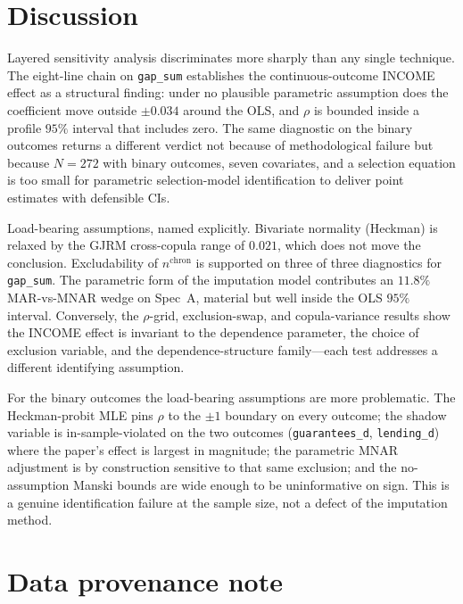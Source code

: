 \documentclass[11pt]{article}
\begin{document}
\section{Discussion}

Layered sensitivity analysis discriminates more sharply than any
single technique. The eight-line chain on \texttt{gap\_sum} establishes
the continuous-outcome INCOME effect as a structural finding: under
no plausible parametric assumption does the coefficient move outside
$\pm 0.034$ around the OLS, and $\rho$ is bounded inside a profile
$95\%$ interval that includes zero. The same diagnostic on the binary
outcomes returns a different verdict not because of methodological
failure but because $N = 272$ with binary outcomes, seven covariates,
and a selection equation is too small for parametric selection-model
identification to deliver point estimates with defensible CIs.

Load-bearing assumptions, named explicitly. Bivariate normality
(Heckman) is relaxed by the GJRM cross-copula range of $0.021$, which
does not move the conclusion. Excludability of $n^{\text{chron}}$ is
supported on three of three diagnostics for \texttt{gap\_sum}. The
parametric form of the imputation model contributes an $11.8\%$
MAR-vs-MNAR wedge on Spec~A, material but well inside the OLS $95\%$
interval. Conversely, the $\rho$-grid, exclusion-swap, and
copula-variance results show the INCOME effect is invariant to the
dependence parameter, the choice of exclusion variable, and the
dependence-structure family---each test addresses a different
identifying assumption.

For the binary outcomes the load-bearing assumptions are more
problematic. The Heckman-probit MLE pins $\rho$ to the $\pm 1$
boundary on every outcome; the shadow variable is in-sample-violated
on the two outcomes (\texttt{guarantees\_d}, \texttt{lending\_d})
where the paper's effect is largest in magnitude; the parametric MNAR
adjustment is by construction sensitive to that same exclusion; and
the no-assumption Manski bounds are wide enough to be uninformative
on sign. This is a genuine identification failure at the sample size,
not a defect of the imputation method.

\section{Data provenance note}\label{sec:provenance}
\end{document}
